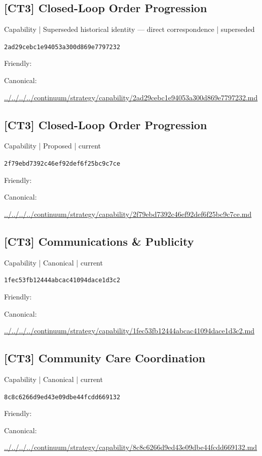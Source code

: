 \documentclass[10pt,a4paper]{article}
\begin{document}
\subsection*{[CT3] Closed-Loop Order Progression}
{\small Capability | Superseded historical identity — direct correspondence | superseded}\par
\texttt{2ad29cebc1e94053a300d869e7797232}\par
Friendly: \par
Canonical: \par
{\footnotesize\url{../../../../continuum/strategy/capability/2ad29cebc1e94053a300d869e7797232.md}}\par
\subsection*{[CT3] Closed-Loop Order Progression}
{\small Capability | Proposed | current}\par
\texttt{2f79ebd7392c46ef92def6f25bc9c7ce}\par
Friendly: \par
Canonical: \par
{\footnotesize\url{../../../../continuum/strategy/capability/2f79ebd7392c46ef92def6f25bc9c7ce.md}}\par
\subsection*{[CT3] Communications \& Publicity}
{\small Capability | Canonical | current}\par
\texttt{1fec53fb12444abcac41094dace1d3c2}\par
Friendly: \par
Canonical: \par
{\footnotesize\url{../../../../continuum/strategy/capability/1fec53fb12444abcac41094dace1d3c2.md}}\par
\subsection*{[CT3] Community Care Coordination}
{\small Capability | Canonical | current}\par
\texttt{8c8c6266d9ed43e09dbe44fcdd669132}\par
Friendly: \par
Canonical: \par
{\footnotesize\url{../../../../continuum/strategy/capability/8c8c6266d9ed43e09dbe44fcdd669132.md}}\par
\end{document}

